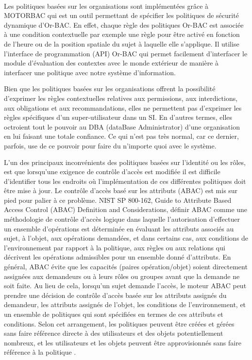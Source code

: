 \paragraph{} Les politiques basées sur les organisations sont implémentées grâce à MOTORBAC qui est un outil  permettant de spécifier les politiques de sécurité dynamique d'Or-BAC. En effet, chaque règle des politiques Or-BAC est associée à une condition contextuelle par exemple une règle pour être activé en fonction de l'heure ou de la position spatiale du sujet à laquelle elle s'applique. Il utilise l'interface de programmation (API) Or-BAC qui permet facilement d'interfacer le module d'évaluation des contextes avec le monde extérieur de manière à interfacer une politique avec notre système d'information.


\label{sectionLimiteOr-bac}

Bien que les politiques basées sur les organisations offrent la possibilité d'exprimer les règles contextuelles relatives aux permissions, aux interdictions, aux obligations et aux recommandations, elles ne permettent pas d'exprimer les règles spécifiques d'un super-utilisateur dans un SI. En d'autres termes, elles octroient tout le pouvoir au DBA (dataBase Administrator) d'une organisation en lui faisant une totale confiance. Ce qui n'est pas très normal, car ce dernier, parfois, use de ce pouvoir pour faire du n'importe quoi avec le système.

\label{sectionABAC}

L'un des principaux inconvénients des politiques basées sur l'identité ou les rôles, est que lorsqu'une exigence de contrôle d'accès est modifiée il est difficile d'identifier tous les endroits où l'implémentation de ces différentes politiques doit être mise à jour. Le contrôle d'accès basé sur les attributs (ABAC) est mis sur pied pour palier à ce problème. NIST SP 800-162, Guide to Attribute Based Access Control (ABAC) Definition and Considerations, définir ABAC comme une méthodologie de contrôle d'accès logique dans laquelle l'autorisation d'effectuer un ensemble d'opérations est déterminée en évaluant les attributs associés au sujet, à l'objet, aux opérations demandées, et dans certains cas, aux conditions de l'environnement par rapport à la politique, aux règles ou aux relations qui décrivent les opérations admissibles pour un ensemble donné d'attributs. En général, ABAC évite que les capacités (paires opération/objet) soient directement assignées aux demandeurs ou à leurs rôles ou groupes avant que la demande ne soit faite. Au lieu de cela, lorsqu'un sujet demande l'accès, le moteur ABAC peut prendre une décision de contrôle d'accès basée sur les attributs assignés du demandeur, les attributs assignés de l'objet, les conditions de l'environnement, et un ensemble de politiques qui sont spécifiées en termes de ces attributs et conditions. Selon cet arrangement, les politiques peuvent être créées et gérées sans faire référence directe à des utilisateurs et des objets potentiellement nombreux, et les utilisateurs et les objets peuvent être approvisionnés sans faire référence à la politique \cite{Vin15}. 

